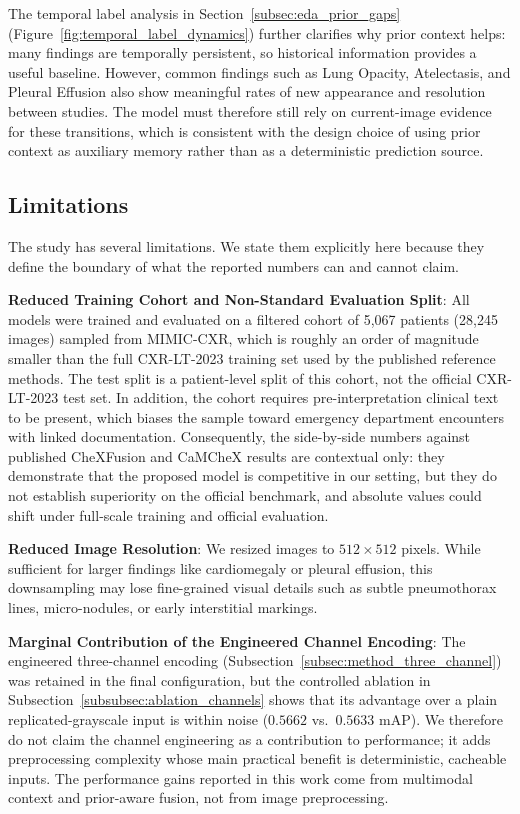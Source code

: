 The temporal label analysis in Section~\ref{subsec:eda_prior_gaps} (Figure~\ref{fig:temporal_label_dynamics}) further clarifies why prior context helps: many findings are temporally persistent, so historical information provides a useful baseline. However, common findings such as Lung Opacity, Atelectasis, and Pleural Effusion also show meaningful rates of new appearance and resolution between studies. The model must therefore still rely on current-image evidence for these transitions, which is consistent with the design choice of using prior context as auxiliary memory rather than as a deterministic prediction source.

\subsection{Limitations}
\label{subsec:discussion_limitations}

The study has several limitations. We state them explicitly here because they define the boundary of what the reported numbers can and cannot claim.

\textbf{Reduced Training Cohort and Non-Standard Evaluation Split}: All models were trained and evaluated on a filtered cohort of 5{,}067 patients (28{,}245 images) sampled from MIMIC-CXR, which is roughly an order of magnitude smaller than the full CXR-LT-2023 training set used by the published reference methods. The test split is a patient-level split of this cohort, not the official CXR-LT-2023 test set. In addition, the cohort requires pre-interpretation clinical text to be present, which biases the sample toward emergency department encounters with linked documentation. Consequently, the side-by-side numbers against published CheXFusion and CaMCheX results are contextual only: they demonstrate that the proposed model is competitive in our setting, but they do not establish superiority on the official benchmark, and absolute values could shift under full-scale training and official evaluation.

\textbf{Reduced Image Resolution}: We resized images to $512 \times 512$ pixels. While sufficient for larger findings like cardiomegaly or pleural effusion, this downsampling may lose fine-grained visual details such as subtle pneumothorax lines, micro-nodules, or early interstitial markings.

\textbf{Marginal Contribution of the Engineered Channel Encoding}: The engineered three-channel encoding (Subsection~\ref{subsec:method_three_channel}) was retained in the final configuration, but the controlled ablation in Subsection~\ref{subsubsec:ablation_channels} shows that its advantage over a plain replicated-grayscale input is within noise ($0.5662$ vs.\ $0.5633$ mAP). We therefore do not claim the channel engineering as a contribution to performance; it adds preprocessing complexity whose main practical benefit is deterministic, cacheable inputs. The performance gains reported in this work come from multimodal context and prior-aware fusion, not from image preprocessing.

